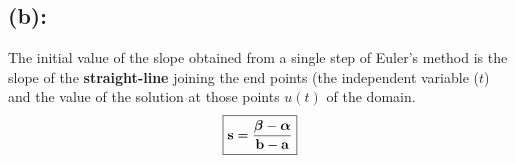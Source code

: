 \subsection*{(b):}
The initial value of the slope obtained from a single step of Euler's method is the slope of the {\bf straight-line} joining the end points (the independent variable ($t$) and the value of the solution at those points $u(t)$ of the domain. 
\begin{align*}
\boxed{
{\bf s}
=
\frac{\bm \beta - \bm \alpha}{\bf b -a}
}
\end{align*}
